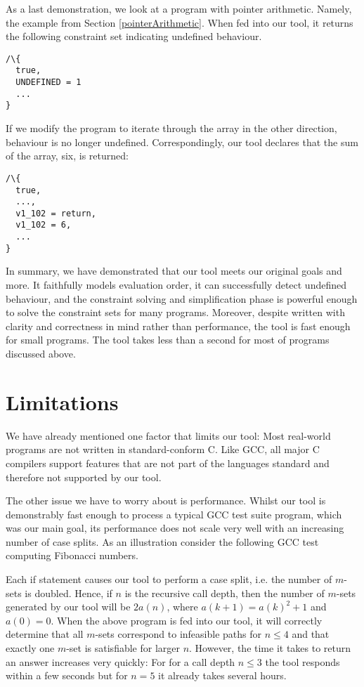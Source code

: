 \documentclass[a4paper,12pt]{scrbook}
\theoremstyle{plain}
\theoremstyle{definition}
\renewcommand{\leq}{\leqslant}
\newcommand{\sem}[1]{{\small{\textsf{#1}}}}
\begin{document}
As a last demonstration, we look at a program with pointer arithmetic. Namely,
the example from Section \ref{pointerArithmetic}.
 When fed into our tool, it returns the
following constraint set indicating undefined behaviour.
\begin{lstlisting}
/\{
  true,
  UNDEFINED = 1
  ...
}
\end{lstlisting}
If we modify the program to iterate through the array in the other direction,
behaviour is no longer undefined.  
Correspondingly, our tool declares that the sum of the array, six, is returned:
\begin{lstlisting}
/\{
  true,
  ...,
  v1_102 = return,
  v1_102 = 6,
  ...
}
\end{lstlisting}

In summary, we have demonstrated that our tool meets our original goals and
more. It faithfully models evaluation order, it can successfully detect
undefined behaviour, and the constraint solving and simplification phase is
powerful enough to solve the constraint sets for many programs. Moreover,
despite written with clarity and correctness in mind rather than performance,
the tool is fast enough for small programs. The tool takes less than a second
for most of programs discussed above.

\section{Limitations}
We have already mentioned one factor that limits our tool: Most real-world
programs are not written in standard-conform C. Like GCC, all major C compilers
support features that are not part of the languages standard and therefore not
supported by our tool.

The other issue we have to worry about is performance. Whilst our tool is
demonstrably fast enough to process a typical GCC test suite program, which was
our main goal, its performance does not scale very well with an increasing
number of case splits. As an illustration consider the following GCC test
computing Fibonacci numbers.  

Each \sem{if} statement causes our tool to perform a case split, i.e. the number
of $m$-sets is doubled. Hence, if $n$ is the recursive call depth, then the
number of $m$-sets generated by our tool will be $2 a(n)$, where $a(k+1) = a(k)^2 + 1$ and $a (0) = 0$. When the above program is fed into our tool, it will
correctly determine that all $m$-sets correspond to infeasible paths for $n \leq
4$ and that exactly one $m$-set is satisfiable for larger $n$. However, the time
it takes to return an answer increases very quickly: For for a call depth $n
\leq 3$ the tool responds within a few seconds but for $n = 5$ it already takes
several hours.
\end{document}
